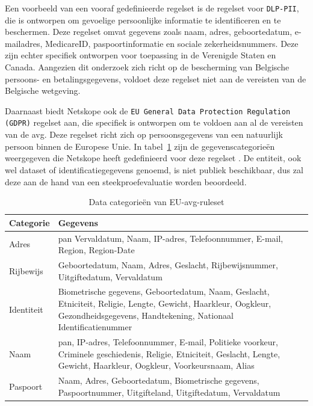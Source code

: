 Een voorbeeld van een vooraf gedefinieerde regelset is de regelset voor \texttt{DLP-PII}, die is ontworpen om gevoelige persoonlijke informatie te identificeren en te beschermen. 
Deze regelset omvat gegevens zoals naam, adres, geboortedatum, e-mailadres, MedicareID, paspoortinformatie en sociale zekerheidsnummers. Deze zijn echter specifiek ontworpen voor toepassing in de Verenigde Staten en Canada. 
Aangezien dit onderzoek zich richt op de bescherming van Belgische persoons\-- en betalingsgegevens, voldoet deze regelset niet aan de vereisten van de Belgische wetgeving.

Daarnaast biedt Netskope ook de \texttt{EU General Data Protection Regulation (GDPR)} regelset aan, die specifiek is ontworpen om te voldoen aan al de vereisten van de \gls{avg}. 
Deze regelset richt zich op persoonsgegevens van een natuurlijk persoon binnen de Europese Unie. 
In tabel~\ref{tab:EU-AVG Netskope} zijn de gegevenscategorieën weergegeven die Netskope heeft gedefinieerd voor deze regelset \autocite{Netskope2023GDPR}. 
De entiteit, ook wel dataset of identificatiegegevens genoemd, is niet publiek beschikbaar, dus zal deze aan de hand van een steekproefevaluatie worden beoordeeld. 

\begin{table}[h]
    \centering
    \small
    \scriptsize
    \begin{tabular}{p{5cm}p{10cm}}
    \toprule
    \textbf{Categorie} & \textbf{Gegevens} \\
    \midrule
    Adres & \gls{pan} Vervaldatum, Naam, IP-adres, Telefoonnummer, E-mail, Region, Region-Date \\
    Rijbewijs & Geboortedatum, Naam, Adres, Geslacht, Rijbewijsnummer, Uitgiftedatum, Vervaldatum \\
    Identiteit & Biometrische gegevens, Geboortedatum, Naam, Geslacht, Etniciteit, Religie, Lengte, Gewicht, Haarkleur, Oogkleur, Gezondheidsgegevens, Handtekening, Nationaal Identificatienummer \\
    Naam & \gls{pan}, IP-adres, Telefoonnummer, E-mail, Politieke voorkeur, Criminele geschiedenis, Religie, Etniciteit, Geslacht, Lengte, Gewicht, Haarkleur, Oogkleur, Voorkeursnaam, Alias \\
    Paspoort & Naam, Adres, Geboortedatum, Biometrische gegevens, Paspoortnummer, Uitgifteland, Uitgiftedatum, Vervaldatum \\
    \bottomrule
    \end{tabular}
    \caption{Data categorieën van EU-\gls{avg}-ruleset \autocite{Netskope2023GDPR}}
    \label{tab:EU-AVG Netskope}
\end{table}

